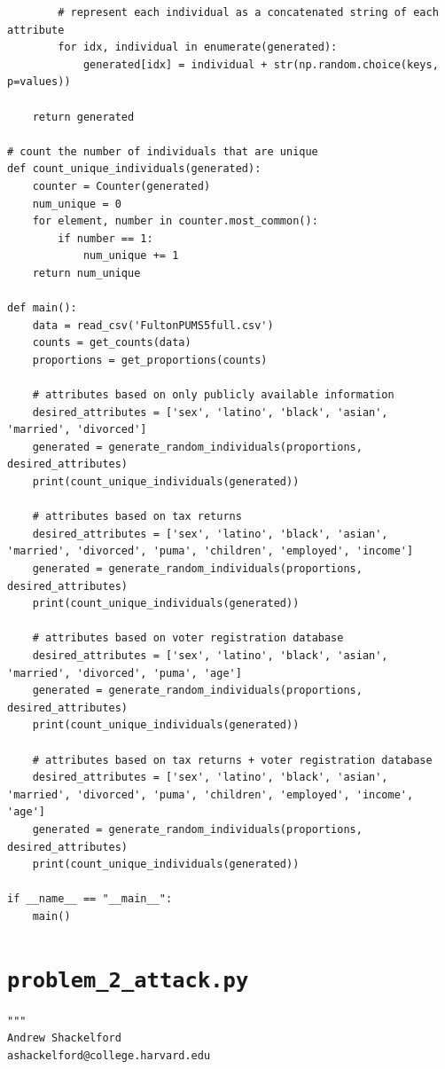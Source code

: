 \documentclass[12pt]{article}
\def\cl{\lstinline}
\begin{document}
\begin{appendices}
\begin{lstlisting}
        # represent each individual as a concatenated string of each attribute
        for idx, individual in enumerate(generated):
            generated[idx] = individual + str(np.random.choice(keys, p=values))

    return generated

# count the number of individuals that are unique
def count_unique_individuals(generated):
    counter = Counter(generated)
    num_unique = 0
    for element, number in counter.most_common():
        if number == 1:
            num_unique += 1
    return num_unique

def main():
    data = read_csv('FultonPUMS5full.csv')
    counts = get_counts(data)
    proportions = get_proportions(counts)

    # attributes based on only publicly available information
    desired_attributes = ['sex', 'latino', 'black', 'asian', 'married', 'divorced']
    generated = generate_random_individuals(proportions, desired_attributes)
    print(count_unique_individuals(generated))

    # attributes based on tax returns
    desired_attributes = ['sex', 'latino', 'black', 'asian', 'married', 'divorced', 'puma', 'children', 'employed', 'income']
    generated = generate_random_individuals(proportions, desired_attributes)
    print(count_unique_individuals(generated))

    # attributes based on voter registration database
    desired_attributes = ['sex', 'latino', 'black', 'asian', 'married', 'divorced', 'puma', 'age']
    generated = generate_random_individuals(proportions, desired_attributes)
    print(count_unique_individuals(generated))

    # attributes based on tax returns + voter registration database
    desired_attributes = ['sex', 'latino', 'black', 'asian', 'married', 'divorced', 'puma', 'children', 'employed', 'income', 'age']
    generated = generate_random_individuals(proportions, desired_attributes)
    print(count_unique_individuals(generated))

if __name__ == "__main__":
    main()
\end{lstlisting}

\newpage

\section{\cl{problem_2_attack.py}}
\label{appendix:problem_2_attack}

\begin{lstlisting}
"""
Andrew Shackelford
ashackelford@college.harvard.edu


\end{lstlisting}
\end{appendices}
\end{document}
